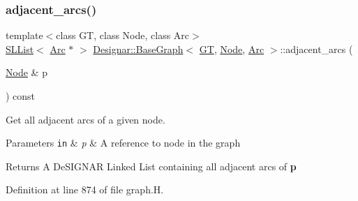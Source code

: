 \subsubsection{\texorpdfstring{adjacent\+\_\+arcs()}{adjacent\_arcs()}}
{\footnotesize\ttfamily template$<$class GT, class Node, class Arc$>$ \\
\hyperlink{class_designar_1_1_s_l_list}{S\+L\+List}$<$ \hyperlink{namespace_designar_a3f55fb5513d62ff47cbc8f72b8e95d6f}{Arc} $\ast$ $>$ \hyperlink{class_designar_1_1_base_graph}{Designar\+::\+Base\+Graph}$<$ \hyperlink{demo-buildgraph_8_c_a3001c40d2c31ca87ed96cd7d1334a55e}{GT}, \hyperlink{namespace_designar_a5af326c65aa2bd26b26c410f2030d09e}{Node}, \hyperlink{namespace_designar_a3f55fb5513d62ff47cbc8f72b8e95d6f}{Arc} $>$\+::adjacent\+\_\+arcs (\begin{DoxyParamCaption}\item[{\hyperlink{namespace_designar_a5af326c65aa2bd26b26c410f2030d09e}{Node} \&}]{p }\end{DoxyParamCaption}) const\hspace{0.3cm}{\ttfamily [inline]}}



Get all adjacent arcs of a given node. 


\begin{DoxyParams}[1]{Parameters}
\mbox{\tt in}  & {\em p} & A reference to node in the graph \\
\hline
\end{DoxyParams}
\begin{DoxyReturn}{Returns}
A De\+S\+I\+G\+N\+AR Linked List containing all adjacent arcs of {\bfseries p} 
\end{DoxyReturn}


Definition at line 874 of file graph.\+H.

\mbox{\label{class_designar_1_1_base_graph_af7a57a1088105a79466546620bf830b3}} 
